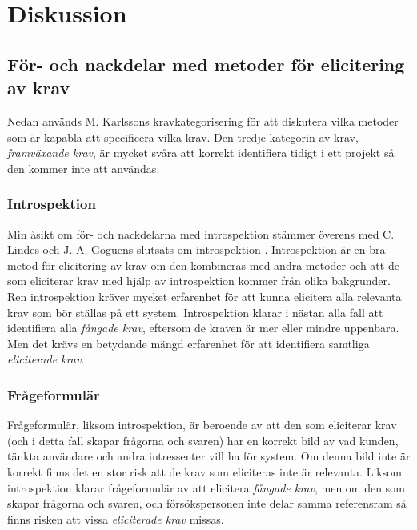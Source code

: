\section{Diskussion}
\label{sec:discussion-jannering}

\subsection{För- och nackdelar med metoder för elicitering av krav}
Nedan används M. Karlssons kravkategorisering för att diskutera vilka metoder som är kapabla att specificera vilka krav. Den tredje kategorin av krav, \textit{framväxande krav}, är mycket svåra att korrekt identifiera tidigt i ett projekt så den kommer inte att användas.
\subsubsection{Introspektion}
Min åsikt om för- och nackdelarna med introspektion stämmer överens med C. Lindes och J. A. Goguens slutsats om introspektion \cite{goguen1993techniques}. Introspektion är en bra metod för elicitering av krav om den kombineras med andra metoder och att de som eliciterar krav med hjälp av introspektion kommer från olika bakgrunder. Ren introspektion kräver mycket erfarenhet för att kunna elicitera alla relevanta krav som bör ställas på ett system. Introspektion klarar i nästan alla fall att identifiera alla \textit{fångade krav}, eftersom de kraven är mer eller mindre uppenbara. Men det krävs en betydande mängd erfarenhet för att identifiera samtliga \textit{eliciterade krav}.

\subsubsection{Frågeformulär}
Frågeformulär, liksom introspektion, är beroende av att den som eliciterar krav (och i detta fall skapar frågorna och svaren) har en korrekt bild av vad kunden, tänkta användare och andra intressenter vill ha för system. Om denna bild inte är korrekt finns det en stor risk att de krav som eliciteras inte är relevanta. Liksom introspektion klarar frågeformulär av att elicitera \textit{fångade krav}, men om den som skapar frågorna och svaren, och försökspersonen inte delar samma referensram så finns risken att vissa \textit{eliciterade krav} missas. 

